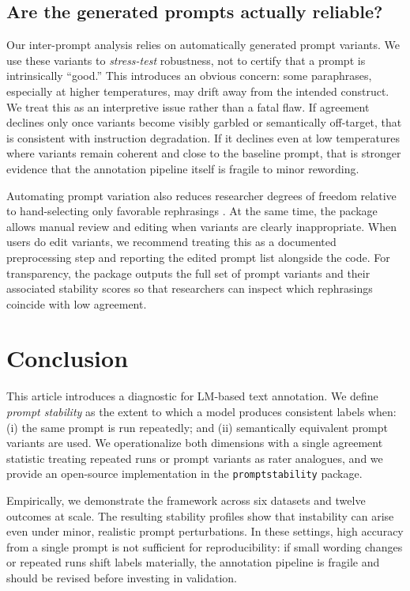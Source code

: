 \documentclass{article}
\begin{document}
\subsection{Are the generated prompts actually reliable?}

Our inter-prompt analysis relies on automatically generated prompt variants. We use these variants to \emph{stress-test} robustness, not to certify that a prompt is intrinsically ``good.'' This introduces an obvious concern: some paraphrases, especially at higher temperatures, may drift away from the intended construct. We treat this as an interpretive issue rather than a fatal flaw. If agreement declines only once variants become visibly garbled or semantically off-target, that is consistent with instruction degradation. If it declines even at low temperatures where variants remain coherent and close to the baseline prompt, that is stronger evidence that the annotation pipeline itself is fragile to minor rewording.

Automating prompt variation also reduces researcher degrees of freedom relative to hand-selecting only favorable rephrasings \citep{chang2009reading, grimmer2013text}. At the same time, the package allows manual review and editing when variants are clearly inappropriate. When users do edit variants, we recommend treating this as a documented preprocessing step and reporting the edited prompt list alongside the code. For transparency, the package outputs the full set of prompt variants and their associated stability scores so that researchers can inspect which rephrasings coincide with low agreement.

\section{Conclusion}

This article introduces a diagnostic for LM-based text annotation. We define \emph{prompt stability} as the extent to which a model produces consistent labels when: (i) the same prompt is run repeatedly; and (ii) semantically equivalent prompt variants are used. We operationalize both dimensions with a single agreement statistic treating repeated runs or prompt variants as rater analogues, and we provide an open-source implementation in the \texttt{promptstability} package.

Empirically, we demonstrate the framework across six datasets and twelve outcomes at scale. The resulting stability profiles show that instability can arise even under minor, realistic prompt perturbations. In these settings, high accuracy from a single prompt is not sufficient for reproducibility: if small wording changes or repeated runs shift labels materially, the annotation pipeline is fragile and should be revised before investing in validation.
\end{document}
